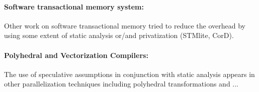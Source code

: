 \paragraph{Software transactional memory system:}

Other work on software transactional memory tried to reduce the overhead by
using some extent of static analysis or/and privatization (STMlite, CorD).

\paragraph{Polyhedral and Vectorization Compilers:}

The use of speculative assumptions in conjunction with static analysis appears
in other parallelization techniques including polyhedral transformations and ...